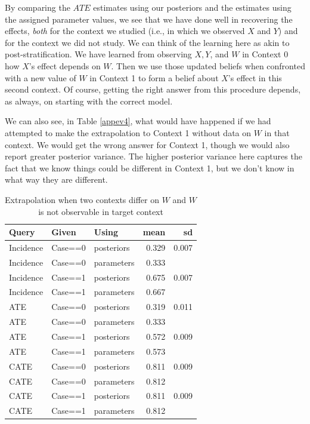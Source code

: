 \documentclass[
  12pt,
]{book}
\begin{document}
By comparing the \(ATE\) estimates using our posteriors and the estimates using the assigned parameter values, we see that we have done well in recovering the effects, \emph{both} for the context we studied (i.e., in which we observed \(X\) and \(Y\)) and for the context we did not study. We can think of the learning here as akin to post-stratification. We have learned from observing \(X, Y\), and \(W\) in Context 0 how \(X\)'s effect depends on \(W\). Then we use those updated beliefs when confronted with a new value of \(W\) in Context 1 to form a belief about \(X\)'s effect in this second context. Of course, getting the right answer from this procedure depends, as always, on starting with the correct model.

We can also see, in Table \ref{appev4}, what would have happened if we had attempted to make the extrapolation to Context 1 without data on \(W\) in that context. We would get the wrong answer for Context 1, though we would also report greater posterior variance. The higher posterior variance here captures the fact that we know things could be different in Context 1, but we don't know in what way they are different.

\begin{table}

\caption{\label{tab:appev4}Extrapolation when two contexts differ on $W$ and $W$ is not observable in target context}
\centering
\begin{tabular}[t]{l|l|l|r|r}
\hline
Query & Given & Using & mean & sd\\
\hline
Incidence & Case==0 & posteriors & 0.329 & 0.007\\
\hline
Incidence & Case==0 & parameters & 0.333 & \\
\hline
Incidence & Case==1 & posteriors & 0.675 & 0.007\\
\hline
Incidence & Case==1 & parameters & 0.667 & \\
\hline
ATE & Case==0 & posteriors & 0.319 & 0.011\\
\hline
ATE & Case==0 & parameters & 0.333 & \\
\hline
ATE & Case==1 & posteriors & 0.572 & 0.009\\
\hline
ATE & Case==1 & parameters & 0.573 & \\
\hline
CATE & Case==0 & posteriors & 0.811 & 0.009\\
\hline
CATE & Case==0 & parameters & 0.812 & \\
\hline
CATE & Case==1 & posteriors & 0.811 & 0.009\\
\hline
CATE & Case==1 & parameters & 0.812 & \\
\hline
\end{tabular}
\end{table}
\end{document}
